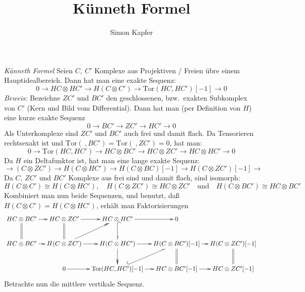 \documentclass[a4paper,10pt]{article}
\title{Künneth Formel}
\author{Simon Kapfer}
\newcommand{\Tor}{\mathrm{Tor}}
\begin{document}
\maketitle

\emph{Künneth Formel} Seien $C,\ C'$ Komplexe aus Projektiven / Freien übre einem Hauptidealbereich. Dann hat man eine exakte Sequenz:
$$
0 \longrightarrow HC \otimes HC' \longrightarrow H(C\otimes C') \longrightarrow \Tor (HC,HC')[-1] \longrightarrow 0 
$$
\emph{Beweis:} Bezeichne $ZC'$ und $BC'$ den geschlossenen, bzw.~exakten Subkomplex von $C'$ (Kern und Bild vom Differential). 
Dann hat man (per Definition von $H$) eine kurze exakte Sequenz
$$
0 \longrightarrow BC' \longrightarrow ZC' \longrightarrow HC' \longrightarrow 0
$$ 
Als Unterkomplexe sind $ZC'$ und $BC'$ auch frei und damit flach. Da Tensorieren rechtsexakt ist und $\Tor(\ ,BC') = \Tor(\ ,ZC') =0$, hat man:
$$ 
0\longrightarrow \Tor(HC,HC') \longrightarrow HC\otimes BC' \longrightarrow HC\otimes ZC' \longrightarrow HC\otimes HC' \longrightarrow 0
$$
Da $H$ ein Deltafunktor ist, hat man eine lange exakte Sequenz:
$$
\longrightarrow(C\otimes ZC') \longrightarrow H(C\otimes HC') \longrightarrow H(C \otimes BC)[-1] \longrightarrow H(C \otimes ZC')[-1]\longrightarrow 
$$
Da $C$, $ZC'$ und $BC'$ Komplexe aus frei sind und damit flach, sind isomorph:
$$
H(C\otimes C') \cong H(C\otimes HC'),\quad H(C\otimes ZC') \cong HC \otimes ZC' \quad \text {und} \quad H(C\otimes BC') \cong HC\otimes BC' 
$$
Kombiniert man nun beide Sequenzen, und benutzt, daß $H(C\otimes C') = H(C\otimes HC')$, erhält man Faktorisierungen
$$
\xymatrix@C=1em{
HC \otimes BC'\ar[r]\ar@{=}[d] &  HC \otimes ZC'  \ar[r] \ar@{=}[d]    &  HC \otimes HC'  \ar@^{(->}[d] \ar[r]  & 0  &\\
HC \otimes BC'  \ar[r]         &  H(C\otimes ZC') \ar[r] \ar@{->>}[ru] &  H(C\otimes HC') \ar[r]\ar@{->>}[d] & 
H(C\otimes BC')[-1] \ar[r]\ar@{=}[d] & H(C\otimes ZC')[-1] \ar@{=}[d] \\
                               &          0\ar[r]            & \Tor(HC,HC')[-1] \ar[r]\ar@^{(->}[ru] & HC\otimes BC'[-1] \ar[r] & HC\otimes ZC'[-1]
  }
$$
Betrachte nun die mittlere vertikale Sequenz.
\end{document}
